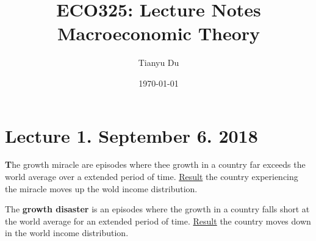 \documentclass[]{article}
\title{ECO325: Lecture Notes \\ Macroeconomic Theory}
\author{Tianyu Du}
\date{\today}
\begin{document}
    \maketitle 
    \tableofcontents
    \newpage
    
    \section{Lecture 1. September 6. 2018}
    \begin{defn}
        \textbf The {growth miracle} are episodes where thee growth in a country far exceeds the world average over a extended period of time. \ul{Result} the country experiencing the miracle moves up the wold income distribution.
    \end{defn}
    
    \begin{defn}
        The \textbf{growth disaster} is an episodes where the growth in a country falls short at the world average for an extended period of time. \ul{Result} the country moves down in the world income distribution.
    \end{defn}
    
    
    
\end{document}
